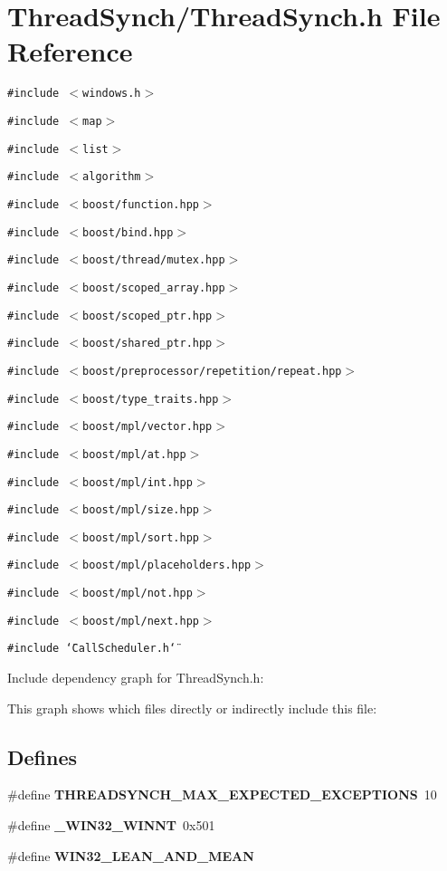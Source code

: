 \section{Thread\-Synch/Thread\-Synch.h File Reference}
\label{_thread_synch_8h}
{\tt \#include $<$windows.h$>$}\par
{\tt \#include $<$map$>$}\par
{\tt \#include $<$list$>$}\par
{\tt \#include $<$algorithm$>$}\par
{\tt \#include $<$boost/function.hpp$>$}\par
{\tt \#include $<$boost/bind.hpp$>$}\par
{\tt \#include $<$boost/thread/mutex.hpp$>$}\par
{\tt \#include $<$boost/scoped\_\-array.hpp$>$}\par
{\tt \#include $<$boost/scoped\_\-ptr.hpp$>$}\par
{\tt \#include $<$boost/shared\_\-ptr.hpp$>$}\par
{\tt \#include $<$boost/preprocessor/repetition/repeat.hpp$>$}\par
{\tt \#include $<$boost/type\_\-traits.hpp$>$}\par
{\tt \#include $<$boost/mpl/vector.hpp$>$}\par
{\tt \#include $<$boost/mpl/at.hpp$>$}\par
{\tt \#include $<$boost/mpl/int.hpp$>$}\par
{\tt \#include $<$boost/mpl/size.hpp$>$}\par
{\tt \#include $<$boost/mpl/sort.hpp$>$}\par
{\tt \#include $<$boost/mpl/placeholders.hpp$>$}\par
{\tt \#include $<$boost/mpl/not.hpp$>$}\par
{\tt \#include $<$boost/mpl/next.hpp$>$}\par
{\tt \#include \char`\"{}Call\-Scheduler.h\char`\"{}}\par


Include dependency graph for Thread\-Synch.h:

This graph shows which files directly or indirectly include this file:\subsection*{Defines}
\begin{CompactItemize}
\item 
\#define {\bf THREADSYNCH\_\-MAX\_\-EXPECTED\_\-EXCEPTIONS}~10
\item 
\#define {\bf \_\-WIN32\_\-WINNT}~0x501
\item 
\#define {\bf WIN32\_\-LEAN\_\-AND\_\-MEAN}
\end{CompactItemize}


